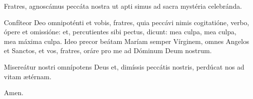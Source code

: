 \Vbardot{} Fratres, agnoscámus peccáta nostra ut apti simus ad sacra mystéria celebránda.

Confíteor Deo omnipoténti et vobis, fratres, quia peccávi nimis cogitatióne, verbo, ópere et omissióne: 
et, percutientes sibi pectus, dicunt: 
mea culpa, mea culpa, mea máxima culpa. 
Ideo precor beátam Maríam semper Vírginem, 
omnes Angelos et Sanctos, et vos, fratres, 
oráre pro me ad Dóminum Deum nostrum.

\Vbardot{} Misereátur nostri omnípotens Deus et, dimíssis peccátis nostris, perdúcat nos ad vitam ætérnam.

\Rbardot{} Amen.


